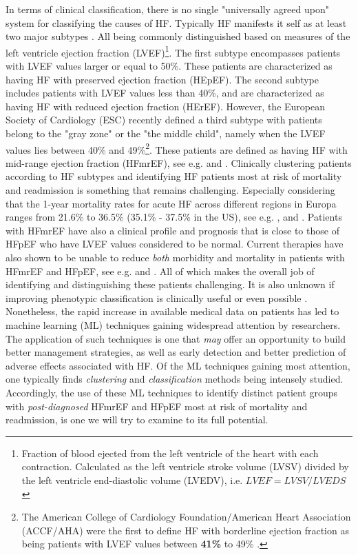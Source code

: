\documentclass[../thesis.tex]{subfiles}
\begin{document}
\indent In terms of clinical classification, there is no single "universally agreed upon" system for classifying the causes of HF. Typically HF manifests it self as at least two major subtypes \citep{alonso2015exploring}. All being commonly distinguished based on measures of the left ventricle ejection fraction (LVEF)\footnote{Fraction of blood ejected from the left ventricle of the heart with each contraction. Calculated as the left ventricle stroke volume (LVSV) divided by the left ventricle end-diastolic volume (LVEDV), i.e. $LVEF = LVSV / LVEDS$ \citep{cikes2015beyond}}. The first subtype encompasses patients with LVEF values larger or equal to 50\%. These patients are characterized as having HF with preserved ejection fraction (HEpEF). The second subtype includes patients with LVEF values less than 40\%, and are characterized as having HF with reduced ejection fraction (HErEF). However, the European Society of Cardiology (ESC) recently defined a third subtype with patients belong to the "gray zone" or the "the middle child", namely when the LVEF values lies between 40\% and 49\%\footnote{The American College of Cardiology Foundation/American Heart Association (ACCF/AHA) were the first to define HF with borderline ejection fraction as being patients with LVEF values between \textbf{41\%} to 49\% \citep{yancy2013}.}. These patients are defined as having HF with mid-range ejection fraction (HFmrEF), see e.g. \cite{lam2014middle} and \cite{ponikowski2016}. Clinically clustering patients according to HF subtypes and identifying HF patients most at risk of mortality and readmission is something that remains challenging. Especially considering that the 1-year mortality rates for acute HF across different regions in Europa ranges from 21.6\% to 36.5\% (35.1\% - 37.5\% in the US), see e.g. \cite{cheng2014outcomes}, \cite{inamdar2016heart} and \cite{crespo2016european}. Patients with HFmrEF have also a clinical profile and prognosis that is close to those of HFpEF who have LVEF values considered to be normal. Current therapies have also shown to be unable to reduce \textit{both} morbidity and mortality in patients with HFmrEF and HFpEF, see e.g. \cite{ponikowski2016} and \cite{hsu2017heart}. All of which makes the overall job of identifying and distinguishing these patients challenging. It is also unknown if improving phenotypic classification is clinically useful or even possible \citep{shah2014phenomapping}.\\
\indent Nonetheless, the rapid increase in available medical data on patients has led to machine learning (ML) techniques gaining widespread attention by researchers. The application of such techniques is one that \textit{may} offer an opportunity to build better management strategies, as well as early detection and better prediction of adverse effects associated with HF. Of the ML techniques gaining most attention, one typically finds \textit{clustering} and \textit{classification} methods being intensely studied. Accordingly, the use of these ML techniques to identify distinct patient groups with \textit{post-diagnosed} HFmrEF and HFpEF most at risk of mortality and readmission, is one we will try to examine to its full potential.
\end{document}
